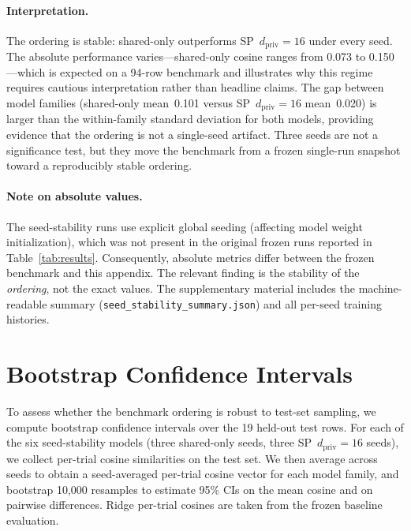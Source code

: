 \documentclass{article}
\begin{document}
\paragraph{Interpretation.}
The ordering is stable: shared-only outperforms
SP~$d_\mathrm{priv}\!=\!16$ under every seed.  The absolute performance
varies---shared-only cosine ranges from 0.073 to 0.150---which is expected on
a 94-row benchmark and illustrates why this regime requires cautious
interpretation rather than headline claims.  The gap between model families
(shared-only mean~0.101 versus SP~$d_\mathrm{priv}\!=\!16$ mean~0.020) is
larger than the within-family standard deviation for both models, providing
evidence that the ordering is not a single-seed artifact.  Three seeds are not
a significance test, but they move the benchmark from a frozen single-run
snapshot toward a reproducibly stable ordering.

\paragraph{Note on absolute values.}
The seed-stability runs use explicit global seeding (affecting model weight
initialization), which was not present in the original frozen runs reported in
Table~\ref{tab:results}.  Consequently, absolute metrics differ between the
frozen benchmark and this appendix.  The relevant finding is the stability of
the \emph{ordering}, not the exact values.  The supplementary material includes
the machine-readable summary (\texttt{seed\_stability\_summary.json}) and all
per-seed training histories.

\section{Bootstrap Confidence Intervals}
\label{app:bootstrap}

To assess whether the benchmark ordering is robust to test-set sampling, we
compute bootstrap confidence intervals over the 19 held-out test rows.  For
each of the six seed-stability models (three shared-only seeds, three
SP~$d_\mathrm{priv}\!=\!16$ seeds), we collect per-trial cosine similarities
on the test set.  We then average across seeds to obtain a seed-averaged
per-trial cosine vector for each model family, and bootstrap 10{,}000 resamples
to estimate 95\% CIs on the mean cosine and on pairwise differences.  Ridge
per-trial cosines are taken from the frozen baseline evaluation.
\end{document}
